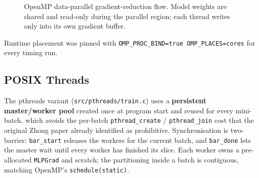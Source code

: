 \documentclass[11pt,a4paper]{article}
\begin{document}
\begin{figure}[H]
  \centering
  \caption{OpenMP data-parallel gradient-reduction flow. Model weights
  are shared and read-only during the parallel region; each thread writes
  only into its own gradient buffer.}
  \label{fig:omp}
\end{figure}

Runtime placement was pinned with \texttt{OMP\_PROC\_BIND=true
OMP\_PLACES=cores} for every timing run.

\subsection{POSIX Threads}\label{sec:pthreads}

The pthreads variant (\texttt{src/pthreads/train.c}) uses a
\textbf{persistent master/worker pool} created once at program start and
reused for every mini-batch, which avoids the per-batch
\texttt{pthread\_create} / \texttt{pthread\_join} cost that the original
Zhong paper already identified as prohibitive. Synchronisation is
two-barrier: \texttt{bar\_start} releases the workers for the current
batch, and \texttt{bar\_done} lets the master wait until every worker has
finished its slice. Each worker owns a pre-allocated \texttt{MLPGrad} and
scratch; the partitioning inside a batch is contiguous, matching OpenMP's
\texttt{schedule(static)}.
\end{document}
